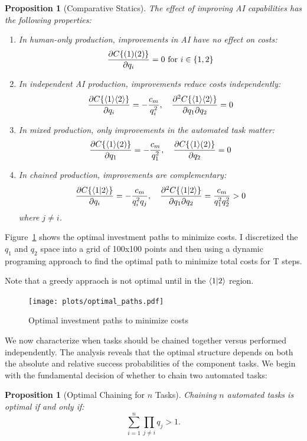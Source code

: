 \documentclass{article}
\newtheorem{proposition}[theorem]{Proposition}
\begin{document}
\begin{proposition}[Comparative Statics]
The effect of improving AI capabilities has the following properties:
\begin{enumerate}
\item In human-only production, improvements in AI have no effect on costs:
\[\frac{\partial C\{ ( 1 )( 2 ) \}}{\partial q_i} = 0 \text{ for } i \in \{1,2\}\]
\item In independent AI production, improvements reduce costs independently:
\[\frac{\partial C\{ \langle 1 \rangle\langle 2 \rangle \}}{\partial q_i} = -\frac{c_m}{q_i^2}, \quad \frac{\partial^2 C\{ \langle 1 \rangle\langle 2 \rangle \}}{\partial q_1 \partial q_2} = 0\]
\item In mixed production, only improvements in the automated task matter:
\[\frac{\partial C\{ \langle 1 \rangle( 2 ) \}}{\partial q_1} = -\frac{c_m}{q_1^2}, \quad \frac{\partial C\{ \langle 1 \rangle( 2 ) \}}{\partial q_2} = 0\]
\item In chained production, improvements are complementary:
\[\frac{\partial C\{ \langle 1|2 \rangle \}}{\partial q_i} = -\frac{c_m}{q_i^2q_j}, \quad \frac{\partial^2 C\{ \langle 1|2 \rangle \}}{\partial q_1 \partial q_2} = \frac{c_m}{q_1^2q_2^2} > 0\]
where $j \neq i$.
\end{enumerate}
\end{proposition}

Figure~\ref{fig:optimal_paths} shows the optimal investment paths to minimize costs.
I discretized the $q_1$ and $q_2$ space into a grid of 100x100 points and then using a dynamic programing approach to find the optimal path to minimize total costs for T steps. 

Note that a greedy appraoch is not optimal until in the $\langle 1|2 \rangle$ region.

\begin{figure}
  \caption{Optimal investment paths to minimize costs} \label{fig:optimal_paths}
  \texttt{[image: plots/optimal\_paths.pdf]}
\end{figure}


We now characterize when tasks should be chained together versus performed independently.
The analysis reveals that the optimal structure depends on both the absolute and relative success probabilities of the component tasks.
We begin with the fundamental decision of whether to chain two automated tasks:

\begin{proposition}[Optimal Chaining for \(n\) Tasks]
  Chaining \(n\) automated tasks is optimal if and only if:
  \[
  \sum_{i=1}^n \prod_{j \neq i} q_j > 1.
  \]
  \end{proposition}
  
\end{document}
